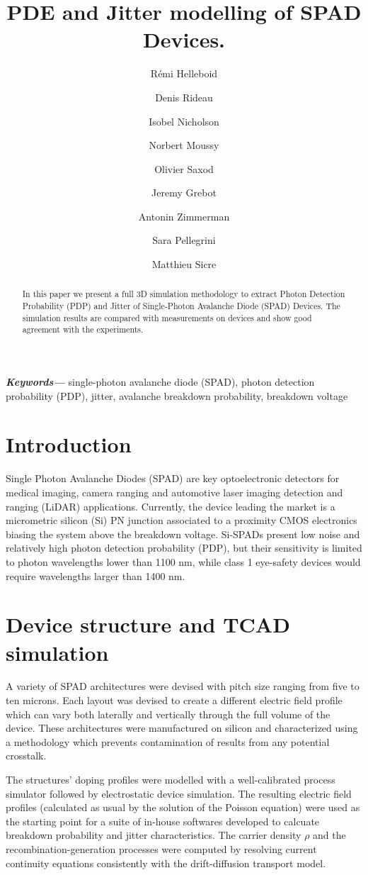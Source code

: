 \documentclass[10pt,a4paper,twocolumn]{article}
\title{PDE and Jitter modelling of SPAD Devices.}
\author[1]{Rémi Helleboid}
\author[1]{Denis Rideau}
\author[2]{Isobel Nicholson}
\author[3]{Norbert Moussy}
\author[3]{Olivier Saxod}
\author[1]{Jeremy Grebot}
\author[1]{Antonin Zimmerman}
\author[2]{Sara Pellegrini}
\author[1]{Matthieu Sicre}
\affil[1]{ST Microelectronics, Crolles, France}
\affil[2]{ST Microelectronics, Edinburgh, UK}
\affil[3]{CEA LETI, Grenoble, France}
\date{}                     %
\providecommand{\keywords}[1]
{
  \small	
  \textbf{\textit{Keywords---}} #1
}
\begin{document}
\maketitle

\begin{abstract}
In this paper we present a full 3D simulation methodology to extract Photon Detection Probability (PDP) and Jitter of Single-Photon Avalanche Diode (SPAD) Devices. The simulation results are compared with measurements on devices and show good agreement with the experiments.\\
\end{abstract}

\keywords{single-photon avalanche diode (SPAD), photon detection probability (PDP), jitter, avalanche breakdown probability, breakdown voltage}

\section{Introduction}
Single Photon Avalanche Diodes (SPAD) are key optoelectronic detectors for medical imaging, camera ranging and automotive laser imaging detection and ranging (LiDAR) applications. Currently, the device leading the market is a micrometric silicon (Si) PN junction associated to a proximity CMOS electronics biasing the system above the breakdown voltage. Si-SPADs present low noise and relatively high photon detection probability (PDP), but their sensitivity is limited to photon wavelengths lower than 1100 nm, while class 1 eye-safety devices would require wavelengths larger than 1400 nm.


\section{Device structure and TCAD simulation}\label{Device}

A variety of SPAD architectures were devised with pitch size ranging from five to ten microns. Each layout was devised to create a different electric field profile which can vary both laterally and vertically through the full volume of the device. These architectures were manufactured on silicon and characterized using a methodology which prevents contamination of results from any potential crosstalk. 

The structures' doping profiles were modelled with a well-calibrated process simulator followed by electrostatic device simulation. The resulting electric field profiles (calculated as usual by the solution of the Poisson equation) were used as the starting point for a suite of in-house softwares developed to calcuate breakdown probability and jitter characteristics. The carrier density $\rho$ and the recombination-generation processes were computed by resolving current continuity equations consistently with the drift-diffusion transport model. 
\end{document}
